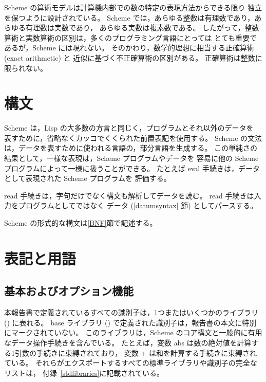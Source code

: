 \vest Scheme の算術モデルは計算機内部での数の特定の表現方法からできる限り
独立を保つように設計されている。
Scheme では，あらゆる整数は有理数であり，あらゆる有理数は実数であり，
あらゆる実数は複素数である。
したがって，整数算術と実数算術の区別は，多くのプログラミング言語にとっては
とても重要であるが，Scheme には現れない。
そのかわり，数学的理想に相当する正確算術 (exact arithmetic) と
近似に基づく不正確算術の区別がある。
正確算術は整数に限られない。

\section{構文}

Scheme は，Lisp の大多数の方言と同じく，プログラムとそれ以外のデータを
表すために，省略なくカッコでくくられた前置表記を使用する。
Scheme の文法は，データを表すために使われる言語の，部分言語を生成する。
この単純さの結果として，一様な表現は，Scheme プログラムやデータを
容易に他の Scheme プログラムによって一様に扱うことができる。
たとえば {\cf eval} 手続きは，データとして表現された Scheme プログラムを
評価する。

{\cf read} 手続きは，字句だけでなく構文も解析してデータを読む。
{\cf read} 手続きは入力をプログラムとしてではなく
データ (\ref{datumsyntax} 節) としてパースする。

Scheme の形式的な構文は\ref{BNF}節で記述する。


\section{表記と用語}


\subsection{基本およびオプション機能}
\label{qualifiers}

本報告書で定義されているすべての識別子は，1つまたはいくつかのライブラリ () に表れる。
base ライブラリ () で定義された識別子は，報告書の本文に特別にマークされていない。
このライブラリは，Scheme のコア構文と一般的に有用なデータ操作手続きを含んでいる。
たとえば，変数 {\cf abs} は数の絶対値を計算する1引数の手続きに束縛されており，
変数 {\cf +} は和を計算する手続きに束縛されている。
それらがエクスポートするすべての標準ライブラリや識別子の完全なリストは，
付録~\ref{stdlibraries}に記載されている。

